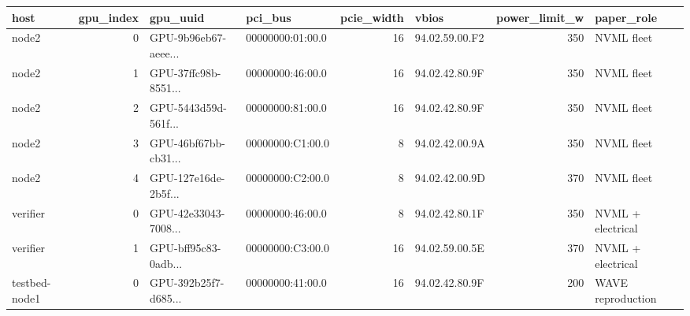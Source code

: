 \begin{tabular}{lrllrlrl}
\toprule
host & gpu\_index & gpu\_uuid & pci\_bus & pcie\_width & vbios & power\_limit\_w & paper\_role \\
\midrule
node2 & 0 & GPU-9b96eb67-aeee... & 00000000:01:00.0 & 16 & 94.02.59.00.F2 & 350 & NVML fleet \\
node2 & 1 & GPU-37ffc98b-8551... & 00000000:46:00.0 & 16 & 94.02.42.80.9F & 350 & NVML fleet \\
node2 & 2 & GPU-5443d59d-561f... & 00000000:81:00.0 & 16 & 94.02.42.80.9F & 350 & NVML fleet \\
node2 & 3 & GPU-46bf67bb-cb31... & 00000000:C1:00.0 & 8 & 94.02.42.00.9A & 350 & NVML fleet \\
node2 & 4 & GPU-127e16de-2b5f... & 00000000:C2:00.0 & 8 & 94.02.42.00.9D & 370 & NVML fleet \\
verifier & 0 & GPU-42e33043-7008... & 00000000:46:00.0 & 8 & 94.02.42.80.1F & 350 & NVML + electrical \\
verifier & 1 & GPU-bff95c83-0adb... & 00000000:C3:00.0 & 16 & 94.02.59.00.5E & 370 & NVML + electrical \\
testbed-node1 & 0 & GPU-392b25f7-d685... & 00000000:41:00.0 & 16 & 94.02.42.80.9F & 200 & WAVE reproduction \\
\bottomrule
\end{tabular}
